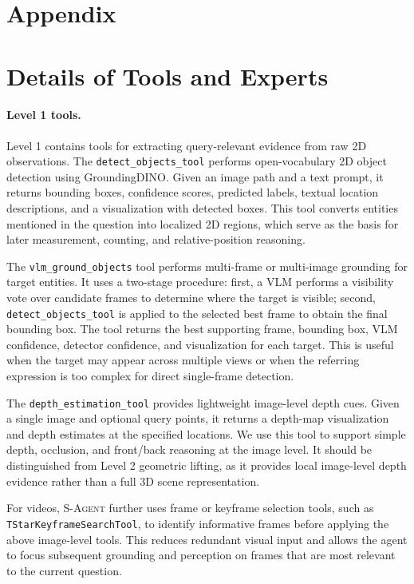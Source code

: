 \section*{Appendix}



\section{Details of Tools and Experts}
\label{app:tools}

\paragraph{Level 1 tools.}
Level 1 contains tools for extracting query-relevant evidence from raw 2D observations. 
The \texttt{detect\_objects\_tool} performs open-vocabulary 2D object detection using GroundingDINO. 
Given an image path and a text prompt, it returns bounding boxes, confidence scores, predicted labels, textual location descriptions, and a visualization with detected boxes. 
This tool converts entities mentioned in the question into localized 2D regions, which serve as the basis for later measurement, counting, and relative-position reasoning.

The \texttt{vlm\_ground\_objects} tool performs multi-frame or multi-image grounding for target entities. 
It uses a two-stage procedure: first, a VLM performs a visibility vote over candidate frames to determine where the target is visible; second, \texttt{detect\_objects\_tool} is applied to the selected best frame to obtain the final bounding box. 
The tool returns the best supporting frame, bounding box, VLM confidence, detector confidence, and visualization for each target. 
This is useful when the target may appear across multiple views or when the referring expression is too complex for direct single-frame detection.

The \texttt{depth\_estimation\_tool} provides lightweight image-level depth cues. 
Given a single image and optional query points, it returns a depth-map visualization and depth estimates at the specified locations. 
We use this tool to support simple depth, occlusion, and front/back reasoning at the image level. 
It should be distinguished from Level 2 geometric lifting, as it provides local image-level depth evidence rather than a full 3D scene representation.

For videos, \textsc{S-Agent} further uses frame or keyframe selection tools, such as \texttt{TStarKeyframeSearchTool}, to identify informative frames before applying the above image-level tools. 
This reduces redundant visual input and allows the agent to focus subsequent grounding and perception on frames that are most relevant to the current question.


